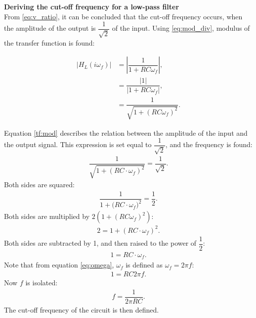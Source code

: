 \textbf{Deriving the cut-off frequency for a low-pass filter}\\

From \eqref{eq:v_ratio}, it can be concluded that the cut-off frequency occurs, when the amplitude of the output is $\dfrac{1}{\sqrt{2}}$ of the input. Using \eqref{eq:mod_div}, modulus of the transfer function is found:

\begin{align}
\left|H_{L}(i \omega_f) \right| &=  \left|\dfrac{1}{1+RC \omega_f} \right|, \nonumber
\\
&=\dfrac{|1|}{|1+RC\omega_f |}, \nonumber
\\
&=  \dfrac{1}{\sqrt{1+(RC \omega_f)^2}}. \label{tf:mod}
\end{align}

Equation \eqref{tf:mod} describes the relation between the amplitude of the input and the output signal. This expression is set equal to $\dfrac{1}{\sqrt{2}}$, and the frequency is found:
\\
\begin{align*}
\dfrac{1}{\sqrt{1+ \left(RC \cdot \omega_f \right)^2}} = \dfrac{1}{\sqrt{2}}.
\end{align*}
Both sides are squared:
\begin{align*}
\dfrac{1}{1+ \big(RC \cdot \omega_f \big)^2} = \dfrac{1}{2}.
\end{align*}
	Both sides are multiplied by $2(1+(RC\omega_f)^2)$:
\begin{align*}
2 = 1+ \left(RC \cdot \omega_f \right)^2.
\end{align*}
Both sides are subtracted by 1, and then raised to the power of $\dfrac{1}{2}$:
\begin{align*}
1 = RC \cdot \omega_f .
\end{align*}
Note that from equation \eqref{eq:omega}, $\omega_f$ is defined as $\omega_f=2 \pi f$:
\begin{align*}
1 = RC 2\pi f .
\end{align*}
Now $f$ is isolated:
\begin{align*}
f=\dfrac{1}{2\pi RC}.
\end{align*}
The cut-off frequency of the circuit is then defined.

